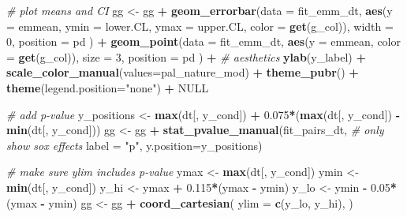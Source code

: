 \documentclass[]{book}
\newenvironment{Shaded}{\begin{snugshade}}{\end{snugshade}}
\newcommand{\CommentTok}[1]{\textcolor[rgb]{0.56,0.35,0.01}{\textit{#1}}}
\newcommand{\DataTypeTok}[1]{\textcolor[rgb]{0.13,0.29,0.53}{#1}}
\newcommand{\DecValTok}[1]{\textcolor[rgb]{0.00,0.00,0.81}{#1}}
\newcommand{\FloatTok}[1]{\textcolor[rgb]{0.00,0.00,0.81}{#1}}
\newcommand{\KeywordTok}[1]{\textcolor[rgb]{0.13,0.29,0.53}{\textbf{#1}}}
\newcommand{\NormalTok}[1]{#1}
\newcommand{\OperatorTok}[1]{\textcolor[rgb]{0.81,0.36,0.00}{\textbf{#1}}}
\newcommand{\OtherTok}[1]{\textcolor[rgb]{0.56,0.35,0.01}{#1}}
\newcommand{\StringTok}[1]{\textcolor[rgb]{0.31,0.60,0.02}{#1}}
\begin{document}
\begin{Shaded}
\begin{Highlighting}[]
{{{  \CommentTok{# plot means and CI}
\NormalTok{  gg <-}\StringTok{ }\NormalTok{gg }\OperatorTok{+}
\StringTok{    }\KeywordTok{geom_errorbar}\NormalTok{(}\DataTypeTok{data =}\NormalTok{ fit_emm_dt, }\KeywordTok{aes}\NormalTok{(}\DataTypeTok{y =}\NormalTok{ emmean,}
                                           \DataTypeTok{ymin =}\NormalTok{ lower.CL,}
                                           \DataTypeTok{ymax =}\NormalTok{ upper.CL,}
                                        \DataTypeTok{color =} \KeywordTok{get}\NormalTok{(g_col)),}
               \DataTypeTok{width =} \DecValTok{0}\NormalTok{,}
              \DataTypeTok{position =}\NormalTok{ pd}
\NormalTok{    ) }\OperatorTok{+}
\StringTok{    }\KeywordTok{geom_point}\NormalTok{(}\DataTypeTok{data =}\NormalTok{ fit_emm_dt, }\KeywordTok{aes}\NormalTok{(}\DataTypeTok{y =}\NormalTok{ emmean,}
                                        \DataTypeTok{color =} \KeywordTok{get}\NormalTok{(g_col)),}
               \DataTypeTok{size =} \DecValTok{3}\NormalTok{,}
              \DataTypeTok{position =}\NormalTok{ pd}
\NormalTok{    ) }\OperatorTok{+}
\StringTok{    }
\StringTok{    }\CommentTok{# aesthetics}
\StringTok{    }\KeywordTok{ylab}\NormalTok{(y_label) }\OperatorTok{+}
\StringTok{    }\KeywordTok{scale_color_manual}\NormalTok{(}\DataTypeTok{values=}\NormalTok{pal_nature_mod) }\OperatorTok{+}
\StringTok{    }\KeywordTok{theme_pubr}\NormalTok{() }\OperatorTok{+}
\StringTok{    }\KeywordTok{theme}\NormalTok{(}\DataTypeTok{legend.position=}\StringTok{"none"}\NormalTok{) }\OperatorTok{+}
\StringTok{    }
\StringTok{    }\OtherTok{NULL}
  
  \CommentTok{# add p-value}
\NormalTok{  y_positions <-}\StringTok{ }\KeywordTok{max}\NormalTok{(dt[, y_cond]) }\OperatorTok{+}\StringTok{ }
\StringTok{    }\FloatTok{0.075}\OperatorTok{*}\NormalTok{(}\KeywordTok{max}\NormalTok{(dt[, y_cond]) }\OperatorTok{-}\StringTok{ }\KeywordTok{min}\NormalTok{(dt[, y_cond]))}
\NormalTok{  gg <-}\StringTok{ }\NormalTok{gg }\OperatorTok{+}
\StringTok{    }\KeywordTok{stat_pvalue_manual}\NormalTok{(fit_pairs_dt, }\CommentTok{# only show sox effects}
                       \DataTypeTok{label =} \StringTok{"p"}\NormalTok{, }
                       \DataTypeTok{y.position=}\NormalTok{y_positions)}
  
  \CommentTok{# make sure ylim includes p-value}
\NormalTok{  ymax <-}\StringTok{ }\KeywordTok{max}\NormalTok{(dt[, y_cond])}
\NormalTok{  ymin <-}\StringTok{ }\KeywordTok{min}\NormalTok{(dt[, y_cond])}
\NormalTok{  y_hi <-}\StringTok{ }\NormalTok{ymax }\OperatorTok{+}\StringTok{ }\FloatTok{0.115}\OperatorTok{*}\NormalTok{(ymax }\OperatorTok{-}\StringTok{ }\NormalTok{ymin)}
\NormalTok{  y_lo <-}\StringTok{ }\NormalTok{ymin }\OperatorTok{-}\StringTok{ }\FloatTok{0.05}\OperatorTok{*}\NormalTok{(ymax }\OperatorTok{-}\StringTok{ }\NormalTok{ymin)}
\NormalTok{  gg <-}\StringTok{ }\NormalTok{gg }\OperatorTok{+}\StringTok{ }\KeywordTok{coord_cartesian}\NormalTok{(}
    \DataTypeTok{ylim =} \KeywordTok{c}\NormalTok{(y_lo, y_hi),}
\NormalTok{  )  }
  
}}}
\end{Highlighting}
\end{Shaded}
\end{document}
